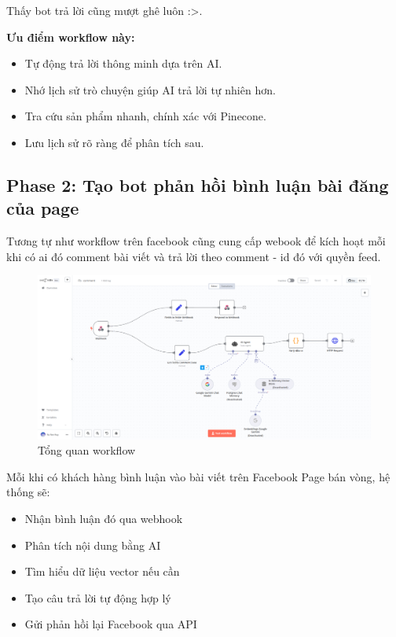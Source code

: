 Thấy bot trả lời cũng mượt ghê luôn :>.

\textbf{Ưu điểm workflow này:}

\begin{itemize}
    \item Tự động trả lời thông minh dựa trên AI.

    \item Nhớ lịch sử trò chuyện giúp AI trả lời tự nhiên hơn.

    \item Tra cứu sản phẩm nhanh, chính xác với Pinecone.

    \item Lưu lịch sử rõ ràng để phân tích sau.
\end{itemize}

\newpage

\subsection{Phase 2: Tạo bot phản hồi bình luận bài đăng của page}

Tương tự như workflow trên facebook cũng cung cấp webook để kích hoạt mỗi khi có ai đó comment bài viết và trả lời theo comment - id đó với quyền feed.

\begin{figure}
    \centering
    \includegraphics[width=1\linewidth]{Chap1-7/fb-comment.pdf}
    \caption{Tổng quan workflow}
\end{figure}
Mỗi khi có khách hàng bình luận vào bài viết trên Facebook Page bán vòng, hệ thống sẽ:

\begin{itemize}
    \item Nhận bình luận đó qua webhook

    \item Phân tích nội dung bằng AI

    \item Tìm hiểu dữ liệu vector nếu cần

    \item Tạo câu trả lời tự động hợp lý

    \item Gửi phản hồi lại Facebook qua API
\end{itemize}

